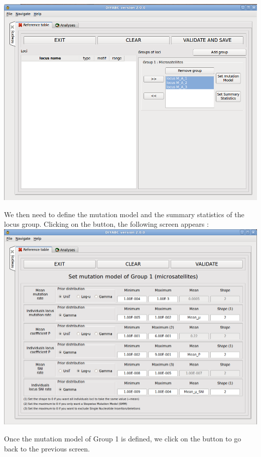 \includegraphics[scale=0.35]{gui_pictures/Capture-DIYABC-18.png} 

We then need to define the mutation model and the summary statistics of the locus group. Clicking on the  button, the following screen appears :\\

\includegraphics[scale=0.35]{gui_pictures/Capture-DIYABC-19.png} 

Once the mutation model of Group 1 is defined, we click on the  button to go back to the previous screen.

